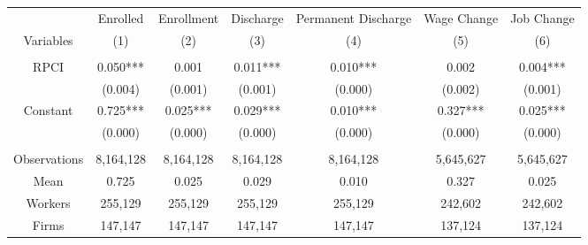 \begin{tabular}{c|cccccc}
\toprule
\toprule
      & \multicolumn{1}{c}{\multirow{2}[1]{*}{Enrolled}} & \multicolumn{1}{c}{\multirow{2}[1]{*}{Enrollment}} & \multicolumn{1}{c}{\multirow{2}[1]{*}{Discharge}} & \multicolumn{1}{c}{\multirow{2}[1]{*}{Permanent Discharge}} & \multicolumn{1}{c}{\multirow{2}[1]{*}{Wage Change}} & \multicolumn{1}{c}{\multirow{2}[1]{*}{Job Change}} \\
      &       &       &       &       &       &  \\
Variables & \multicolumn{1}{p{6.25em}}{(1)} & \multicolumn{1}{p{6.25em}}{(2)} & \multicolumn{1}{p{6.25em}}{(3)} & \multicolumn{1}{p{6.25em}}{(4)} & \multicolumn{1}{p{6.25em}}{(5)} & \multicolumn{1}{p{6.25em}}{(6)} \\
\midrule
      &       &       &       &       &       &  \\
RPCI  & \multicolumn{1}{p{6.25em}}{0.050***} & 0.001 & \multicolumn{1}{p{6.25em}}{0.011***} & \multicolumn{1}{p{6.25em}}{0.010***} & 0.002 & \multicolumn{1}{p{6.25em}}{0.004***} \\
      & (0.004) & (0.001) & (0.001) & (0.000) & (0.002) & (0.001) \\
Constant & \multicolumn{1}{p{6.25em}}{0.725***} & \multicolumn{1}{p{6.25em}}{0.025***} & \multicolumn{1}{p{6.25em}}{0.029***} & \multicolumn{1}{p{6.25em}}{0.010***} & \multicolumn{1}{p{6.25em}}{0.327***} & \multicolumn{1}{p{6.25em}}{0.025***} \\
      & (0.000) & (0.000) & (0.000) & (0.000) & (0.000) & (0.000) \\
      &       &       &       &       &       &  \\
\midrule
Observations & 8,164,128 & 8,164,128 & 8,164,128 & 8,164,128 & 5,645,627 & 5,645,627 \\
Mean  & 0.725 & 0.025 & 0.029 & 0.010 & 0.327 & 0.025 \\
Workers & 255,129 & 255,129 & 255,129 & 255,129 & 242,602 & 242,602 \\
Firms & 147,147 & 147,147 & 147,147 & 147,147 & 137,124 & 137,124 \\
\bottomrule
\bottomrule
\end{tabular}%
